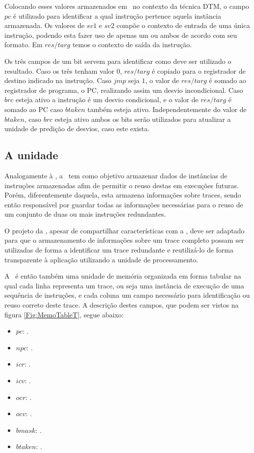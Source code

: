 Colocando esses valores armazenados em \tableg\ no contexto da técnica DTM, o campo $pc$ é utilizado para identificar a qual instrução pertence aquela instância armazenada. Os valores de $sv1$ e $sv2$ compõe o contexto de entrada de uma única instrução, podendo esta fazer uso de apenas um ou ambos de acordo com seu formato. Em $res/targ$ temos o contexto de saída da instrução.

Os três campos de um bit servem para identificar como deve ser utilizado o resultado. Caso os três tenham valor $0$, $res/targ$ é copiado para o registrador de destino indicado na instrução. Caso $jmp$ seja $1$, o valor de $res/targ$ é somado ao registrador de programa, o PC, realizando assim um desvio incondicional. Caso $brc$ esteja ativo a instrução é um desvio condicional, e o valor de $res/targ$ é somado ao PC caso $btaken$ também esteja ativo. Independentemente do valor de $btaken$, caso $brc$ esteja ativo ambos os bits serão utilizados para atualizar a unidade de predição de desvios, caso este exista.

\subsection{A unidade \tablet}
\label{Fundamentacao:DTMHardware:TableT}

Analogamente à \tableg, a \tablet\ tem como objetivo armazenar dados de instâncias de instruções armazenadas afim de permitir o reuso destas em execuções futuras. Porém, diferentemente daquela, esta armazena informações sobre traces, sendo então responsável por guardar todas as informações necessárias para o reuso de um conjunto de duas ou mais instruções redundantes.

O projeto da \tablet, apesar de compartilhar características com a \tableg, deve ser adaptado para que o armazenamento de informações sobre um trace completo possam ser utilizadas de forma a identificar um trace redundante e reutilizá-lo de forma transparente à aplicação utilizando a unidade de processamento. 

A \tablet\ é então também uma unidade de memória organizada em forma tabular na qual cada linha representa um trace, ou seja uma instância de execução de uma sequência de instruções, e cada coluna um campo necessário para identificação ou reuso correto deste trace. A descrição destes campos, que podem ser vistos na figura \ref{Fig:MemoTableT}, segue abaixo:

\begin{itemize}
	\item $pc$: .
	\item $npc$: .
	\item $icr$: .
	\item $icv$: .
	\item $ocr$: .
	\item $ocv$: .
	\item $bmask$: .
	\item $btaken$: .
\end{itemize}

